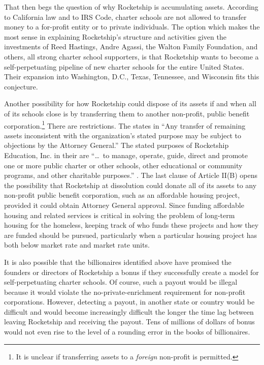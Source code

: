 \vspace{-1\baselineskip}
That then begs the question of why Rocketship is accumulating assets. According to California law and to IRS Code, charter schools are not allowed to transfer money to a for-profit entity or to private individuals. The option which makes the most sense in explaining Rocketship's structure and activities given the investments of Reed Hastings, Andre Agassi, the Walton Family Foundation, and others, all strong charter school supporters, is that Rocketship wants to become a self-perpetuating pipeline of new charter schools for the entire United States. Their expansion into Washington, D.C., Texas, Tennessee, and Wisconsin fits this conjecture.

Another possibility for how Rocketship could dispose of its assets if and when all of its schools close is by transferring them to another non-profit, public benefit corporation.\footnote{It is unclear if transferring assets to a \textit{foreign} non-profit is permitted.} There are restrictions. The \citeauthor{CALDOJ2014} states in  ``Any transfer of remaining assets inconsistent with the organization’s stated purpose may be subject to objections by the Attorney General.'' The stated purposes of Rocketship Education, Inc. in their  are ``\ldots~to manage, operate, guide, direct and promote one or more public charter or other schools, other educational or community programs, and other charitable purposes.'' \parencite[1]{RSED2022}. The last clause of Article II(B) opens the possibility that Rocketship at dissolution could donate all of its assets to any non-profit public benefit corporation, such as an affordable housing project, provided it could obtain Attorney General approval.  Since funding affordable housing and related services is critical in solving the problem of long-term housing for the homeless, keeping track of who funds these projects and how they are funded should be pursued, particularly when a particular housing project has both below market rate and market rate units.

It is also possible that the billionaires identified above have promised the founders or directors of Rocketship a bonus if they successfully create a model for self-perpetuating charter schools. Of course, such a payout would be illegal because it would violate the no-private-enrichment requirement for non-profit corporations. However, detecting a payout, in another state or country would be difficult and would become increasingly difficult the longer the time lag between leaving Rocketship and receiving the payout. Tens of millions of dollars of bonus would not even rise to the level of a rounding error in the books of billionaires.

